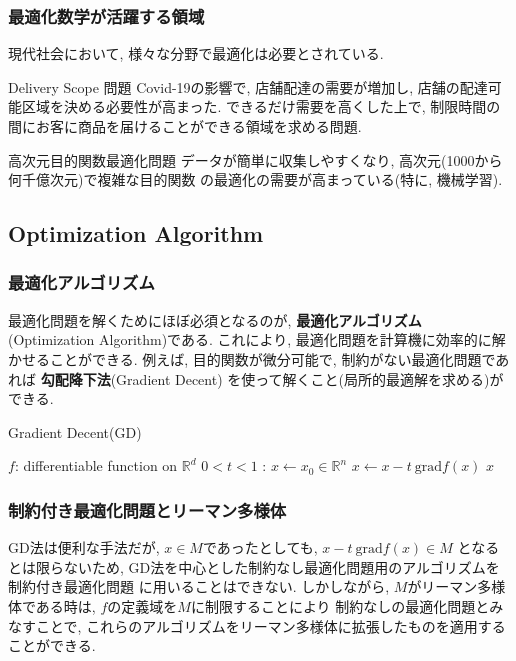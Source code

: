 \documentclass[dvipdfmx,11pt]{beamer}		%
\newcommand{\R}{\mathbb{R}}
\begin{document}
    \begin{frame}
        \frametitle{最適化数学が活躍する領域}
        現代社会において, 様々な分野で最適化は必要とされている.
        \begin{exampleblock}{Delivery Scope 問題}
            Covid-19の影響で, 店舗配達の需要が増加し, 店舗の配達可能区域を決める必要性が高まった.
            できるだけ需要を高くした上で, 制限時間の間にお客に商品を届けることができる領域を求める問題.
        \end{exampleblock}
        \begin{exampleblock}{高次元目的関数最適化問題}
            データが簡単に収集しやすくなり, 高次元(1000から何千億次元)で複雑な目的関数
            の最適化の需要が高まっている(特に, 機械学習). 
        \end{exampleblock} 
    \end{frame}
    \subsection{Optimization Algorithm}
    \begin{frame}
        \frametitle{最適化アルゴリズム}
        最適化問題を解くためにほぼ必須となるのが, \textbf{最適化アルゴリズム} (Optimization Algorithm)である.
        これにより, 最適化問題を計算機に効率的に解かせることができる. 例えば, 目的関数が微分可能で, 制約がない最適化問題であれば
        \textbf{勾配降下法}(Gradient Decent) を使って解くこと(局所的最適解を求める)ができる.
        \begin{algorithm}[H]
            \caption{Gradient Decent(GD)}
            \begin{algorithmic}
                \REQUIRE $f$: differentiable function on $\R^{d}$
                \REQUIRE $0< t <1$ : 
                \STATE $x\leftarrow x_{0}\in\R^n$
                \STATE $x\leftarrow x - t~\mathrm{grad} f(x)$ 
                \ENDWHILE
                \RETURN $x$
            \end{algorithmic}
        \end{algorithm}
    \end{frame}
    \begin{frame}
        \frametitle{制約付き最適化問題とリーマン多様体}
        GD法は便利な手法だが, $x\in M$であったとしても, $x - t~\mathrm{grad} f(x)\in M$
        となるとは限らないため, GD法を中心とした制約なし最適化問題用のアルゴリズムを制約付き最適化問題
        に用いることはできない. しかしながら, $M$がリーマン多様体である時は, $f$の定義域を$M$に制限することにより
        制約なしの最適化問題とみなすことで, これらのアルゴリズムをリーマン多様体に拡張したものを適用することができる. 
    \end{frame}
\end{document}
